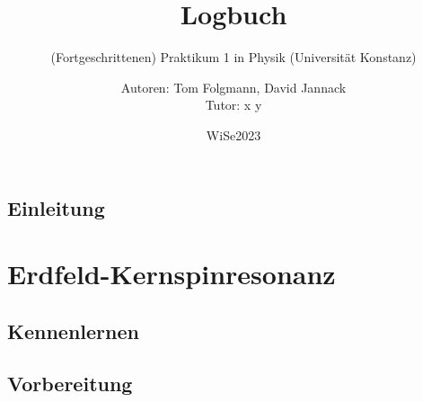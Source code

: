 \documentclass[
    twoside=true, 
    footinclude=off, 
    captions=tableheading, 
    DIV=12;usenames,
    dvipsnames
]{scrbook}
\begin{document}
    \title{Logbuch}
    \subtitle{(Fortgeschrittenen) Praktikum 1 in Physik (Universität Konstanz)}
    \author{Autoren: Tom Folgmann, David Jannack \\ \large{Tutor: x y}}
    \date{WiSe2023}
    \maketitle
    \thispagestyle{empty}
    \section*{Einleitung}
        

    \newpage


    \tableofcontents

\newtheorem{quest}{Vorbereitungsthema}
\newtheorem{answ}{Antwort }
\newenvironment{Frage}{%
    \begin{center}
        \dotfill\parskip1em

        \begin{minipage}{0.95\textwidth}
            \begin{quest}\end{quest}
}{
        \end{minipage}\par
        \dotfill
    \end{center}
}
\newenvironment{Antwort}{

}{

}



\newpage

\chapter{Erdfeld-Kernspinresonanz}
    \section{Kennenlernen}
        

    \newpage
    \section{Vorbereitung}
        
\end{document}
